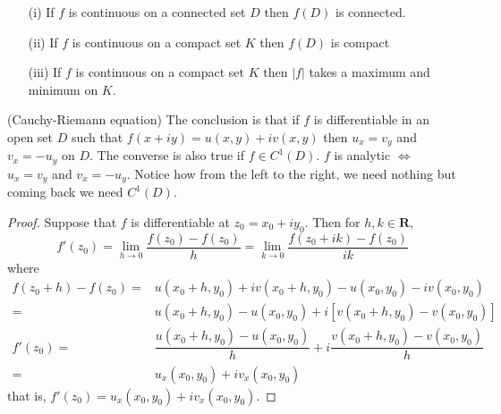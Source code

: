 \vspace{2ex}
\begin{thm}
\begin{itemize}
	\item[(i)] If $f$ is continuous on a connected set $D$ then $f(D)$ is connected. 
	\item[(ii)] If $f$ is continuous on a compact set $K$ then $f(D)$ is compact
	\item[(iii)] If $f$ is continuous on a compact set $K$ then $|f|$ takes a maximum and minimum on $K$. 
\end{itemize}
\end{thm}
\vspace{2ex}
\begin{thm}
(Cauchy-Riemann equation) The conclusion is that if $f$ is differentiable in an open set $D$ such that $f(x+iy)=u(x,y)+iv(x,y)$ then $u_{x}=v_{y}$ and $v_{x}=-u_{y}$ on $D$. The converse is also true if $f\in C^{1}(D)$. $f$ is analytic $\iff$ $u_{x}=v_{y}$ and $v_{x}=-u_{y}$. Notice how from the left to the right, we need nothing but coming back we need $C^{1}(D)$. 
\end{thm}
\vspace{2ex}
\begin{proof}
Suppose that $f$ is differentiable at $z_0=x_0+iy_0$. Then for $h,k\in {\bm R}$,
\[f'(z_0)=\lim _{h\rightarrow 0}\dfrac{f(z_0)-f(z_0)}{h}=\lim _{k\rightarrow 0}\dfrac{f(z_0+ik)-f(z_0)}{ik}\]
where 
\begin{align*}
	f(z_0+h)-f(z_0)=&u(x_0+h,y_0)+iv(x_0+h,y_0)-u(x_0,y_0)-iv(x_0,y_0)\\
	=&u(x_0+h,y_0)-u(x_0,y_0)+i[v(x_0+h,y_0)-v(x_0,y_0)]\\
	f'(z_0)=&\dfrac{u(x_0+h,y_0)-u(x_0,y_0)}{h}+i\dfrac{v(x_0+h,y_0)-v(x_0,y_0)}{h}\\
=& u_{x}(x_0,y_0)+iv_{x}(x_0,y_0)
\end{align*}
that is, $f'(z_0)=u_{x}(x_0,y_0)+iv_{x}(x_0,y_0)$.
\end{proof}
\vspace{2ex}


